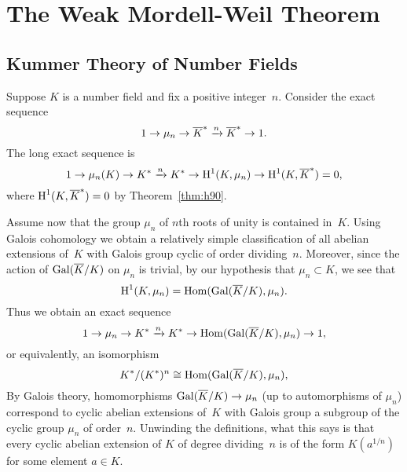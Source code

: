 
\chapter{The Weak Mordell-Weil Theorem}\label{ch:weakmw}
\section{Kummer Theory of Number Fields}\label{sec:kummernf}
Suppose $K$ is a number field and fix a positive integer~$n$.
Consider the
exact sequence
$$
  1 \to \mu_n \to \overline{K}^* \xrightarrow{n} \overline{K}^* \to 1.
$$
The long exact sequence is
$$
 1 \to \mu_n(K) \to K^* \xrightarrow{n} K^* \to \operatorname{H}^1(K,\mu_n) \to \operatorname{H}^1(K,\overline{K}^*) =0,
$$
where $\operatorname{H}^1(K,\overline{K}^*)=0$ by Theorem~\ref{thm:h90}.

Assume now that the group $\mu_n$ of $n$th roots of unity is contained
in~$K$.  Using Galois cohomology we obtain a relatively simple
classification of all abelian extensions of~$K$ with Galois group
cyclic of order dividing~$n$.  Moreover, since the action of
$\operatorname{Gal}(\overline{K}/K)$ on $\mu_n$ is trivial, by our hypothesis that
$\mu_n\subset K$, we see that
$$
  \operatorname{H}^1(K,\mu_n) = \operatorname{Hom}(\operatorname{Gal}(\overline{K}/K),\mu_n).
$$
Thus we obtain an exact sequence
$$
 1 \to \mu_n \to K^* \xrightarrow{n} K^* \to \operatorname{Hom}(\operatorname{Gal}(\overline{K}/K),\mu_n) \to 1,
$$
or equivalently, an isomorphism
$$
     K^*/(K^*)^n \cong \operatorname{Hom}(\operatorname{Gal}(\overline{K}/K),\mu_n),
$$
By Galois theory, homomorphisms $\operatorname{Gal}(\overline{K}/K)\to \mu_n$ (up to
automorphisms of $\mu_n$) correspond to cyclic abelian extensions
of~$K$ with Galois group a subgroup of the cyclic group $\mu_n$ of
order~$n$.  Unwinding the definitions, what this says is that every
cyclic abelian extension of $K$ of degree dividing~$n$ is of the form
$K(a^{1/n})$ for some element $a\in K$.  


